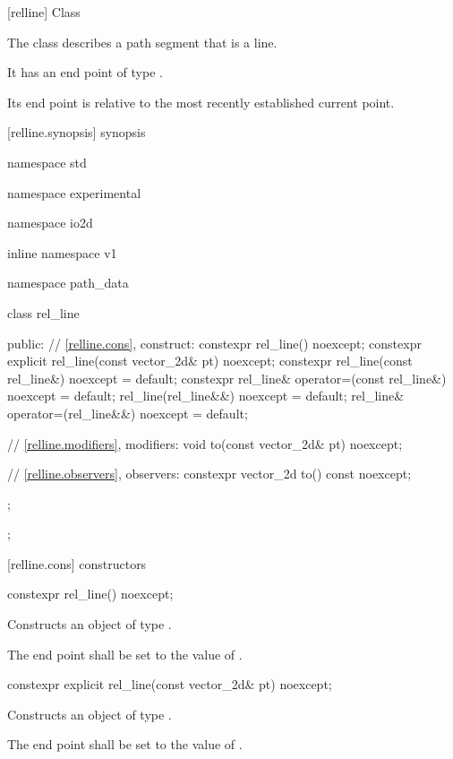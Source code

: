  [relline] {Class }

\pnum
{}
The class  describes a path segment that is a line.

\pnum
It has an end point of type .

\pnum
Its end point is relative to the most recently established current point.

 [relline.synopsis] { synopsis}

\begin{codeblock}
namespace std { namespace experimental { namespace io2d { inline namespace v1 {
  namespace path_data {
    class rel_line {
    public:
      // \ref{relline.cons}, construct:
      constexpr rel_line() noexcept;
      constexpr explicit rel_line(const vector_2d& pt) noexcept;
      constexpr rel_line(const rel_line&) noexcept = default;
      constexpr rel_line& operator=(const rel_line&) noexcept = default;
      rel_line(rel_line&&) noexcept = default;
      rel_line& operator=(rel_line&&) noexcept = default;

      // \ref{relline.modifiers}, modifiers:
      void to(const vector_2d& pt) noexcept;

      // \ref{relline.observers}, observers:
      constexpr vector_2d to() const noexcept;
    };
  };
} } } }
\end{codeblock}

 [relline.cons] { constructors}

\begin{itemdecl}
constexpr rel_line() noexcept;
\end{itemdecl}
\begin{itemdescr}
\pnum
\effects
Constructs an object of type .

\pnum
The end point shall be set to the value of .
\end{itemdescr}

\begin{itemdecl}
constexpr explicit rel_line(const vector_2d& pt) noexcept;
\end{itemdecl}
\begin{itemdescr}
\pnum
\effects
Constructs an object of type .

\pnum
The end point shall be set to the value of .
\end{itemdescr}

